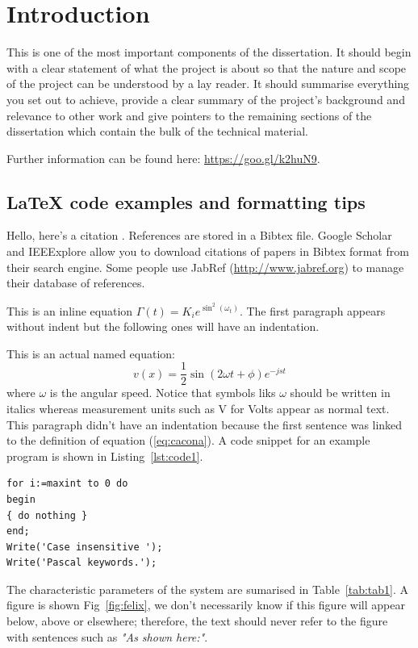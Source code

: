 \chapter{Introduction}
This is one of the most important components of the dissertation. It should begin with a clear statement of what the project is about so that the nature and scope of the project can be understood by a lay reader. It should summarise everything you set out to achieve, provide a clear summary of the project's background and relevance to other work and give pointers to the remaining sections of the dissertation which contain the bulk of the technical material.

Further information can be found here: \url{https://goo.gl/k2huN9}.

\section{\LaTeX{} code examples and formatting tips}
Hello, here's a citation \cite{greenwade93}. References are stored in a Bibtex file. Google Scholar and IEEExplore allow you to download citations of papers in Bibtex format from their search engine. Some people use JabRef (\url{http://www.jabref.org}) to manage their database of references.

This is an inline equation $\Gamma(t)=K_i e^{\sin^2(\omega_t)}$. The first paragraph appears without indent but the following ones will have an indentation.

This is an actual named equation:
\begin{equation}
v(x)=\frac{1}{2}\sin(2 \omega t + \phi) e^{-j s t}
\label{eq:cacona}
\end{equation}
\noindent where $\omega$ is the angular speed. Notice that symbols liks $\omega$ should be written in italics whereas measurement units such as V for Volts appear as normal text. This paragraph didn't have an indentation because the first sentence was linked to the definition of equation (\ref{eq:cacona}). A code snippet for an example program is shown in Listing~\ref{lst:code1}.

\begin{lstlisting}[caption=Source code for {\it hello.m},label=lst:code1,breaklines=true,basewidth=4pt,prebreak=**,postbreak=**,frame=single]
for i:=maxint to 0 do
begin
{ do nothing }
end;
Write('Case insensitive ');
Write('Pascal keywords.');
\end{lstlisting}

The characteristic parameters of the system are sumarised in Table~\ref{tab:tab1}. A figure is shown Fig~\ref{fig:felix}, we don't necessarily know if this figure will appear below, above or elsewhere; therefore, the text should never refer to the figure with sentences such as {\it "As shown here:"}.

